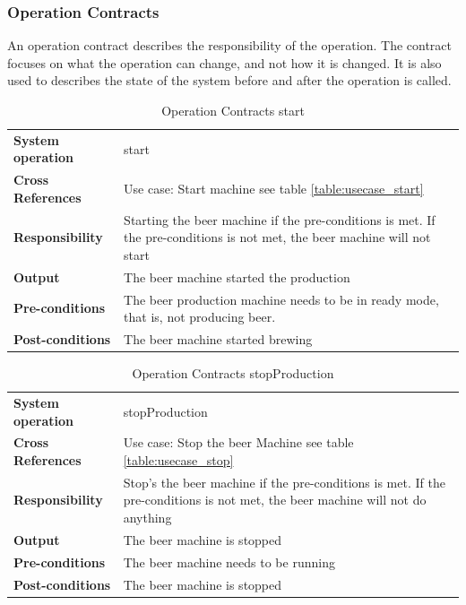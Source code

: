 \subsubsection{Operation Contracts}
An operation contract describes the responsibility of the operation. 
The contract focuses on what the operation can change, and not how it is changed. 
It is also used to describes the state of the system before and after the 
operation is called.
\begin{table}[H]
    \begin{tabularx}{\textwidth}{|>{\RaggedRight}p{3.7cm}|>{\RaggedRight}X|}
        \hline
        \multicolumn{2}{|c|}{\textbf{start}}\\
        \hline
        \textbf{System operation} & start\\
        \hline
        \textbf{Cross References} & Use case: Start machine see table \ref{table:usecase_start} \\
        \hline
        \textbf{Responsibility} & Starting the beer machine if the pre-conditions 
        is met.
            If the pre-conditions is not met, the beer machine will not start \\
        \hline
        \textbf{Output} & The beer machine started the production\\
        \hline
        \textbf{Pre-conditions} & 
            The beer production machine needs to be in
            ready mode, that is, not producing beer. \\
        \hline
        \textbf{Post-conditions} & The beer machine started brewing\\
        \hline
    \end{tabularx}
    \caption{Operation Contracts start} 
    \label{table:Operation_Contracts_start}
\end{table}

\begin{table}[H]
    \begin{tabularx}{\textwidth}{|>{\RaggedRight}p{3.7cm}|>{\RaggedRight}X|}
        \hline
        \multicolumn{2}{|c|}{\textbf{stopProduction}}\\
        \hline
        \textbf{System operation} & stopProduction\\
        \hline
        \textbf{Cross References} & Use case: Stop the beer Machine see table \ref{table:usecase_stop}\\
        \hline
        \textbf{Responsibility} & Stop's the beer machine if the pre-conditions is met.
        If the pre-conditions is not met, the beer machine will not do anything\\
        \hline
        \textbf{Output} & The beer machine is stopped\\
        \hline
        \textbf{Pre-conditions} & The beer machine needs to be running\\
        \hline
        \textbf{Post-conditions} & The beer machine is stopped\\
        \hline
    \end{tabularx}
    \caption{Operation Contracts stopProduction} 
    \label{table:Operation_Contracts_stopProduction}
\end{table}


